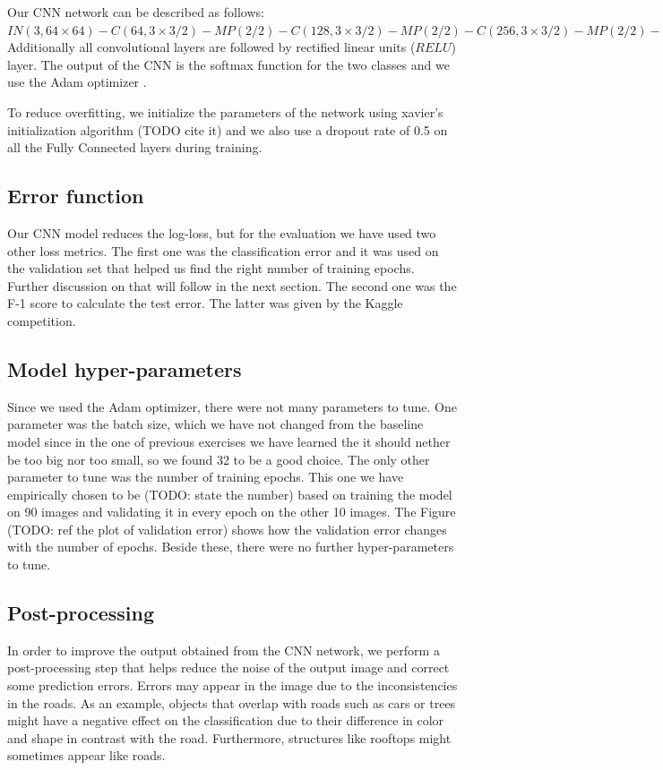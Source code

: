 \documentclass[10pt,conference,compsocconf]{IEEEtran}
\begin{document}
Our CNN network can be described as follows: \\
$IN(3, 64\times64)
-C(64, 3\times3 /2) - MP(2 / 2) - C(128, 3\times3 /2) - MP(2 / 2)
-C(256, 3\times3 /2) - MP(2 / 2) - C(512, 3\times3 /2) - MP(2 / 2)
-FC(2048)-FC(2048)-FC(2)$\\

Additionally all convolutional layers are followed by rectified linear units ($RELU$) layer. The output of the CNN is the softmax function for the two classes and we use the Adam optimizer \cite{adam}.

To reduce overfitting, we initialize the parameters of the network using xavier's initialization algorithm (TODO cite it) and we also use a dropout rate of 0.5 on all the Fully Connected layers during training.
\subsection{Error function}
Our CNN model reduces the log-loss, but for the evaluation we have used two other loss metrics. The first one was
the classification error and it was used on the validation set that helped us find the right number of training epochs. 
Further discussion on that will follow in the next section. The second one was the F-1 score to calculate
the test error. The latter was given by the Kaggle competition.


\subsection{Model hyper-parameters}
Since we used the Adam optimizer, there were not many parameters to tune. One parameter was the batch size, which we 
have not changed from the baseline model since in the one of previous exercises we have learned the it should nether be too
big nor too small, so we found 32 to be a good choice. The only other parameter to tune was the number of training epochs.
This one we have empirically chosen to be (TODO: state the number) based on training the model on 90 images and 
validating it in every epoch on the other 10 images. The Figure (TODO: ref the plot of validation error) shows
how the validation error changes with the number of epochs. Beside these, there were no further hyper-parameters to tune.


\subsection{Post-processing}
In order to improve the output obtained from the CNN network, we perform a post-processing step that helps reduce the noise of the output image and correct some prediction errors. Errors may appear in the image due to the inconsistencies in the roads. As an example, objects that overlap with roads such as cars or trees might have a negative effect on the classification due to their difference in color and shape in contrast with the road. Furthermore, structures like rooftops might sometimes appear like roads.\\
\end{document}
